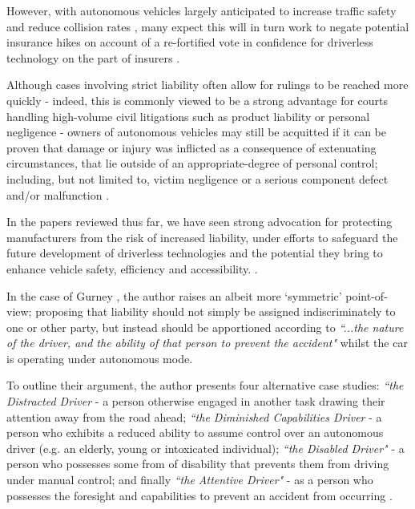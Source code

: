 \documentclass[conference]{IEEEtran}
\begin{document}
However, with autonomous vehicles largely anticipated to increase traffic safety and reduce collision rates \cite{duffy, marchant, schellekens}, many expect this will in turn work to negate potential insurance hikes on account of a re-fortified vote in confidence for driverless technology on the part of insurers \cite{duffy, marchant}. 

Although cases involving strict liability often allow for rulings to be reached more quickly - indeed, this is commonly viewed to be a strong advantage for courts handling high-volume civil litigations such as product liability or personal negligence \cite{duffy} - owners of autonomous vehicles may still be acquitted if it can be proven that damage or injury was inflicted as a consequence of extenuating circumstances, that lie outside of an appropriate-degree of personal control; including, but not limited to, victim negligence or a serious component defect and/or malfunction \cite{duffy}.

In the papers reviewed thus far, we have seen strong advocation for protecting manufacturers from the risk of increased liability, under efforts to safeguard the future development of driverless technologies and the potential they bring to enhance vehicle safety, efficiency and accessibility. \cite{beiker, schellekens, marchant}. 

In the case of Gurney \cite{gurney}, the author raises an albeit more `symmetric' point-of-view; proposing that liability should not simply be assigned indiscriminately to one or other party, but instead should be apportioned according to \textit{``...the nature of the driver, and the ability of that person to prevent the accident"} whilst the car is operating under autonomous mode. 

To outline their argument, the author presents four alternative case studies: \textit{``the Distracted Driver} - a person otherwise engaged in another task drawing their attention away from the road ahead; \textit{``the Diminished Capabilities Driver} - a person who exhibits a reduced ability to assume control over an autonomous driver (e.g. an elderly, young or intoxicated individual); \textit{``the Disabled Driver"} - a person who possesses some from of disability that prevents them from driving under manual control; and finally \textit{``the Attentive Driver"} - as a person who possesses the foresight and capabilities to prevent an accident from occurring \cite{gurney}. 
\end{document}
